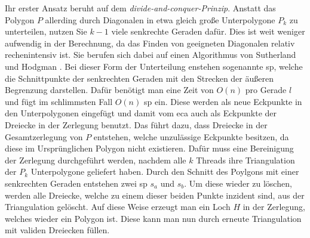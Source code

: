 Ihr erster Ansatz beruht auf dem \emph{divide-and-conquer-Prinzip}. Anstatt das Polygon $P$ allerding durch Diagonalen in etwa gleich große Unterpolygone $P_k$ zu unterteilen, 
nutzen Sie $k-1$ viele senkrechte Geraden dafür. Dies ist weit weniger aufwendig in der Berechnung, da das Finden von geeigneten Diagonalen relativ rechenintensiv ist.
Sie berufen sich dabei auf einen Algorithmus von Sutherland und Hodgman \cite{dnc}. Bei dieser Form der Unterteilung enstehen sogenannte \ac{sp}, welche die Schnittpunkte der senkrechten Geraden mit 
den Strecken der äußeren Begrenzung darstellen. Dafür benötigt man eine Zeit von $O(n)$ pro Gerade $l$ und fügt im schlimmsten Fall $O(n)$ \ac{sp} ein. Diese werden als neue Eckpunkte in den Unterpolygonen eingefügt und damit vom \ac{eca} auch als Eckpunkte der Dreiecke in der Zerlegung benutzt. 
Das führt dazu, dass Dreiecke in der Gesamtzerlegung von $P$ entstehen, welche unzulässige Eckpunkte besitzen, da diese im Ursprünglichen Polygon nicht existieren. 
Dafür muss eine Bereinigung der Zerlegung durchgeführt werden, nachdem alle $k$ Threads ihre Triangulation der $P_k$ Unterpolygone geliefert haben. 
Durch den Schnitt des Poylgons mit einer senkrechten Geraden entstehen zwei \ac{sp} $s_a$ und $s_b$. Um diese wieder zu löschen, werden alle Dreiecke, welche zu einem dieser beiden Punkte inzident sind, aus der Triangulation 
gelöscht. Auf diese Weise erzeugt man ein Loch $H$ in der Zerlegung, welches wieder ein Polygon ist. Diese kann man nun durch erneute Triangulation mit validen Dreiecken füllen. \linebreak 

